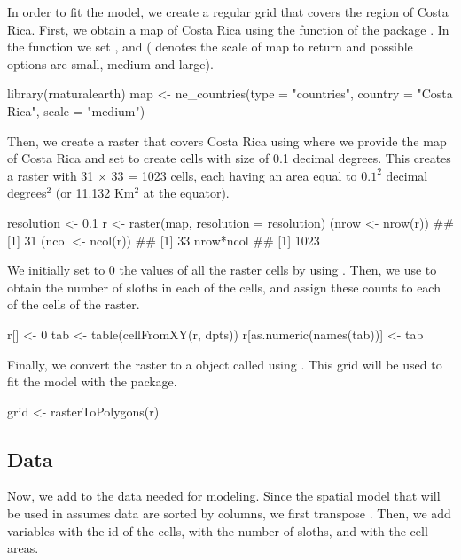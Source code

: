 In order to fit the model, we create a regular grid that covers the region of Costa Rica.
First, we obtain a map of Costa Rica using the  function of the  package \citep{Rrnaturalearth}. In the function we set ,  and  ( denotes the scale of map to return and possible options are small, medium and large).

\begin{example}
library(rnaturalearth)
map <- ne_countries(type = "countries", country = "Costa Rica", scale = "medium")
\end{example}

Then, we create a raster that covers Costa Rica using  where we provide the map of Costa Rica and set  to create cells with size of 0.1 decimal degrees.
This creates a raster with 31 $\times$ 33 = 1023 cells, each having an area equal to $0.1^2$ decimal degrees$^2$ (or 11.132 Km$^2$ at the equator).

\begin{example}
resolution <- 0.1
r <- raster(map, resolution = resolution)
(nrow <- nrow(r))
## [1] 31
(ncol <- ncol(r))
## [1] 33
nrow*ncol
## [1] 1023
\end{example}

We initially set to 0 the values of all the raster cells by using .
Then, we use  to obtain the number of sloths in each of the cells, and assign these counts to each of the cells of the raster.

\begin{example}
r[] <- 0
tab <- table(cellFromXY(r, dpts))
r[as.numeric(names(tab))] <- tab
\end{example}

Finally, we convert the raster  to a  object called  using .
This grid will be used to fit the model with the  package.

\begin{example}
grid <- rasterToPolygons(r)
\end{example}



\subsection{Data}

Now, we add to  the data needed for modeling.
Since the spatial model that will be used in  assumes data are sorted by columns, we first transpose .
Then, we add variables  with the id of the cells,  with the number of sloths, and  with the cell areas.

